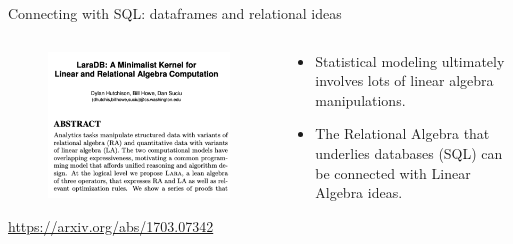 \documentclass[aspectratio=169]{../latex_main/tntbeamer}  %
\begin{document}
	\begin{frame}{Connecting with SQL: dataframes and relational ideas}
	      \begin{columns}
	        \begin{column}{.4\textwidth}
	                  \begin{figure}
	                            \includegraphics[scale=.3]{Bild2}  
	                  \end{figure}
	                  \url{https://arxiv.org/abs/1703.07342}
	        \end{column}
	        
	        
	        \begin{column}{.4\textwidth}
	                  \begin{itemize}
	                      \item Statistical modeling ultimately involves lots of linear algebra manipulations.
	                      \item The Relational Algebra that underlies databases (SQL) can be connected with Linear Algebra ideas.
	                  \end{itemize}
	        \end{column}
	        
	      \end{columns}
	      
	        
	       
	\end{frame}
	
\end{document}
